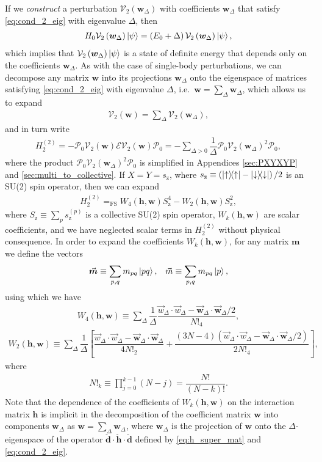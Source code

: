 \documentclass[nofootinbib,notitlepage,11pt]{revtex4-2}
\newcommand{\f}[2]{\dfrac{#1}{#2}} %
\newcommand{\p}[1]{\left(#1\right)} %
\renewcommand{\sp}[1]{\left[#1\right]} %
\renewcommand{\c}{\cdot} %
\newcommand{\m}{\bm} %
\renewcommand{\v}{\vec} %
\newcommand{\1}{\mathds{1}}
\newcommand{\up}{\uparrow}
\newcommand{\dn}{\downarrow}
\newcommand{\z}{\text{z}}
\newcommand{\E}{\mathcal{E}}
\renewcommand{\P}{\mathcal{P}}
\newcommand{\V}{\mathcal{V}}
\newcommand{\EQFS}{=_{\text{FS}}}
\begin{document}
If we {\it construct} a perturbation $\V_2\p{\m w_\Delta}$ with
coefficients $\m w_\Delta$ that satisfy \eqref{eq:cond_2_eig} with
eigenvalue $\Delta$, then
\begin{align}
  H_0 \V_2\p{\m w_\Delta} \ket\psi
  = \p{E_0 + \Delta} \V_2\p{\m w_\Delta} \ket\psi,
\end{align}
which implies that $\V_2\p{\m w_\Delta}\ket\psi$ is a state of
definite energy that depends only on the coefficients $\m w_\Delta$.
As with the case of single-body perturbations, we can decompose any
matrix $\m w$ into its projections $\m w_\Delta$ onto the eigenspace
of matrices satisfying \eqref{eq:cond_2_eig} with eigenvalue $\Delta$,
i.e.~$\m w=\sum_\Delta\m w_\Delta$, which allows us to expand
\begin{align}
  \V_2\p{\m w} = \sum_\Delta \V_2\p{\m w_\Delta},
\end{align}
and in turn write
\begin{align}
  H_2^{(2)} = - \P_0 \V_2\p{\m w} \E \V_2\p{\m w} \P_0
  = -\sum_{\Delta>0} \f1\Delta \P_0 \V_2\p{\m w_\Delta}^2 \P_0,
\end{align}
where the product $\P_0 \V_2\p{\m w_\Delta}^2 \P_0$ is simplified in
Appendices \ref{sec:PXYXYP} and \ref{sec:multi_to_collective}.  If
$X=Y=s_\z$, where $s_\z\equiv\p{\op\up-\op\dn}/2$ is an SU(2) spin
operator, then we can expand
\begin{align}
  H_2^{(2)} \EQFS W_4\p{\m h,\m w} S_\z^4 - W_2\p{\m h,\m w} S_\z^2,
\end{align}
where $S_\z\equiv\sum_p s_\z^{(p)}$ is a collective SU(2) spin
operator, $W_k\p{\m h,\m w}$ are scalar coefficients, and we have
neglected scalar terms in $H_2^{(2)}$ without physical consequence.
In order to expand the coefficients $W_k\p{\m h,\m w}$, for any matrix
$\m m$ we define the vectors
\begin{align}
  \v{\m m} \equiv \sum_{p,q} m_{pq} \ket{pq},
  &&
  \v m \equiv \sum_{p,q} m_{pq} \ket{p},
\end{align}
using which we have
\begin{align}
  W_4\p{\m h,\m w}
  \equiv \sum_\Delta \f1\Delta \f{\v w_\Delta\c\v w_\Delta
    - \v{\m w}_\Delta\c\v{\m w}_\Delta/2}{N!_4},
\end{align}
\begin{align}
  W_2\p{\m h,\m w}
  \equiv \sum_\Delta \f1{\Delta} \sp{\f{\v w_\Delta\c\v w_\Delta
      - \v{\m w}_\Delta\c\v{\m w}_\Delta}{4N!_2}
    + \f{\p{3N-4}\p{\v w_\Delta\c\v w_\Delta
        - \v{\m w}_\Delta\c\v{\m w}_\Delta/2}}{2N!_4}},
\end{align}
where
\begin{align}
  N!_k \equiv \prod_{j=0}^{k-1} \p{N-j} = \f{N!}{\p{N-k}!}.
\end{align}
Note that the dependence of the coefficients of $W_k\p{\m h,\m w}$ on
the interaction matrix $\m h$ is implicit in the decomposition of the
coefficient matrix $\m w$ into components $\m w_\Delta$ as
$\m w=\sum_\Delta\m w_\Delta$, where $\m w_\Delta$ is the projection
of $\m w$ onto the $\Delta$-eigenspace of the operator
$\check{\m d}\c\check{\m h}\c\check{\m d}$ defined by
\eqref{eq:h_super_mat} and \eqref{eq:cond_2_eig}.
\end{document}
